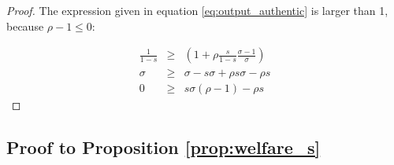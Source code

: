\documentclass[12pt]{article}
\begin{document}
\begin{proof}
The expression given in equation \eqref{eq:output_authentic} is larger than 1, because $\rho - 1\leq 0$:


\begin{eqnarray*}
\frac{1}{1-s}&\geq&\left( 1+\rho \frac{s}{1-s}  \frac{\sigma - 1}{\sigma}   \right) \\
\sigma &\geq & \sigma - s\sigma + \rho s \sigma - \rho s \\
0 &\geq & s \sigma (\rho - 1) -   \rho s 
\end{eqnarray*}


\end{proof}

\subsection{Proof to Proposition  \ref{prop:welfare_s}}
\end{document}
